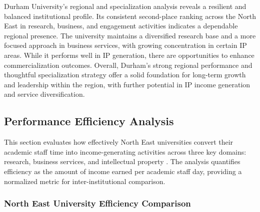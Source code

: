 \documentclass[journal,onecolumn, 10pt,draftclsnofoot]{IEEEtran}
\begin{document}
Durham University's regional and specialization analysis reveals a resilient and balanced institutional profile. Its consistent second-place ranking across the North East in research, business, and engagement activities indicates a dependable regional presence. The university maintains a diversified research base and a more focused approach in business services, with growing concentration in certain IP areas. While it performs well in IP generation, there are opportunities to enhance commercialization outcomes. Overall, Durham's strong regional performance and thoughtful specialization strategy offer a solid foundation for long-term growth and leadership within the region, with further potential in IP income generation and service diversification.

\subsection{Performance Efficiency Analysis}

This section evaluates how effectively North East universities convert their academic staff time into income-generating activities across three key domains: research, business services, and intellectual property \cite{johnes2006data,worthington2001empirical}. The analysis quantifies efficiency as the amount of income earned per academic staff day, providing a normalized metric for inter-institutional comparison.

\subsubsection{North East University Efficiency Comparison}
\end{document}
